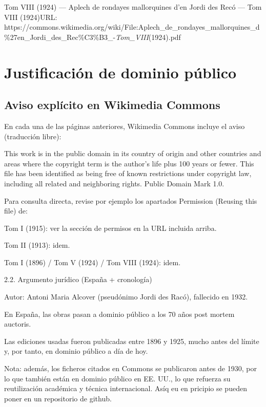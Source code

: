 \documentclass[
  letterpaper,
  DIV=11,
  numbers=noendperiod]{scrreprt}
\begin{document}
Tom VIII (1924) --- Aplech de rondayes mallorquines d'en Jordi des Recó
--- Tom VIII (1924)URL:
https://commons.wikimedia.org/wiki/File:Aplech\_de\_rondayes\_mallorquines\_d\%27en\_Jordi\_des\_Rec\%C3\%B3\_-\emph{Tom\_VIII}(1924).pdf

\section{Justificación de dominio
público}\label{justificaciuxf3n-de-dominio-puxfablico}

\subsection{Aviso explícito en Wikimedia
Commons}\label{aviso-expluxedcito-en-wikimedia-commons}

En cada una de las páginas anteriores, Wikimedia Commons incluye el
aviso (traducción libre):

This work is in the public domain in its country of origin and other
countries and areas where the copyright term is the author's life plus
100 years or fewer. This file has been identified as being free of known
restrictions under copyright law, including all related and neighboring
rights. Public Domain Mark 1.0.

Para consulta directa, revise por ejemplo los apartados Permission
(Reusing this file) de:

Tom I (1915): ver la sección de permisos en la URL incluida arriba.

Tom II (1913): idem.

Tom I (1896) / Tom V (1924) / Tom VIII (1924): idem.

2.2. Argumento jurídico (España + cronología)

Autor: Antoni Maria Alcover (pseudónimo Jordi des Racó), fallecido en
1932.

En España, las obras pasan a dominio público a los 70 años post mortem
auctoris.

Las ediciones usadas fueron publicadas entre 1896 y 1925, mucho antes
del límite y, por tanto, en dominio público a día de hoy.

Nota: además, los ficheros citados en Commons se publicaron antes de
1930, por lo que también están en dominio público en EE. UU., lo que
refuerza su reutilización académica y técnica internacional. Asíq eu en
pricipio se pueden poner en un repositorio de github.

\end{document}
